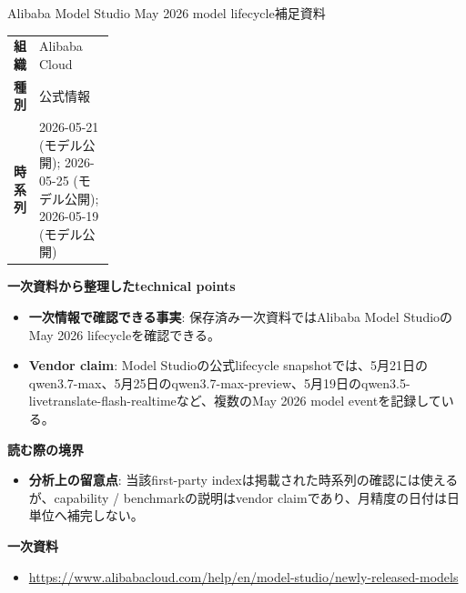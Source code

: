 \begin{technicalnote}{Alibaba Model Studio May 2026 model lifecycle}{補足資料}
\begingroup
\begin{tabularx}{\linewidth}{@{}>{\bfseries}p{0.22\linewidth}X@{}}
組織 & Alibaba Cloud \\
種別 & 公式情報 \\
時系列 & 2026-05-21 (モデル公開); 2026-05-25 (モデル公開); 2026-05-19 (モデル公開) \\
\end{tabularx}
\smallskip
{\bfseries 一次資料から整理したtechnical points}
\begin{itemize}[leftmargin=1.5em,itemsep=0.35em]
\item \textbf{一次情報で確認できる事実}: 保存済み一次資料ではAlibaba Model StudioのMay 2026 lifecycleを確認できる。
\item \textbf{Vendor claim}: Model Studioの公式lifecycle snapshotでは、5月21日のqwen3.7-max、5月25日のqwen3.7-max-preview、5月19日のqwen3.5-livetranslate-flash-realtimeなど、複数のMay 2026 model eventを記録している。
\end{itemize}
{\bfseries 読む際の境界}
\begin{itemize}[leftmargin=1.5em,itemsep=0.35em]
\item \textbf{分析上の留意点}: 当該first-party indexは掲載された時系列の確認には使えるが、capability / benchmarkの説明はvendor claimであり、月精度の日付は日単位へ補完しない。
\end{itemize}
\begin{samepage}
{\bfseries 一次資料}
\begingroup\sloppy
\begin{itemize}[leftmargin=1.5em,itemsep=0.25em]
\item {\scriptsize\url{https://www.alibabacloud.com/help/en/model-studio/newly-released-models}}
\end{itemize}
\endgroup
\end{samepage}
\endgroup
\end{technicalnote}
\medskip

